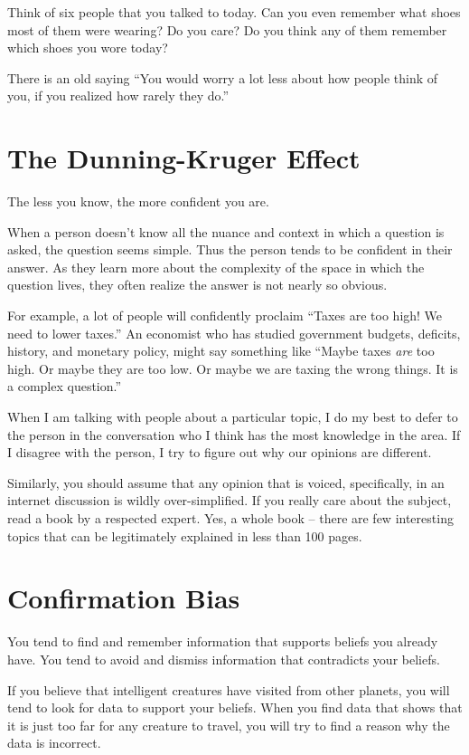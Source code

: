 Think of six people that you talked to today. Can you even remember what
shoes most of them were wearing? Do you care? Do you think any of them
remember which shoes you wore today?

There is an old saying ``You would worry a lot less about how people
think of you, if you realized how rarely they do.''

\section{The Dunning-Kruger Effect}

The less you know, the more confident you are.

When a person doesn't know all the nuance and context in which a question is
asked, the question seems simple. Thus the person tends to be confident in
their answer. As they learn more about the complexity of the space in
which the question lives, they often realize the answer is not nearly so
obvious.

For example, a lot of people will confidently proclaim ``Taxes are too
high! We need to lower taxes.''  An economist who has studied
government budgets, deficits, history, and monetary policy, might say
something like ``Maybe taxes \emph{are} too high. Or maybe they are
too low. Or maybe we are taxing the wrong things. It is a 
complex question.''

When I am talking with people about a particular topic, I do my best
to defer to the person in the conversation who I think has the most
knowledge in the area. If I disagree with the person, I try to figure
out why our opinions are different.

Similarly, you should assume that any opinion that is voiced, specifically, in an
internet discussion is wildly over-simplified. If you really care
about the subject, read a book by a respected expert. Yes, a whole
book -- there are few interesting topics that can be legitimately
explained in less than 100 pages.

\section{Confirmation Bias}

You tend to find and remember information that supports
beliefs you already have. You tend to avoid and dismiss information
that contradicts your beliefs.

If you believe that intelligent creatures have visited from other
planets, you will tend to look for data to support your beliefs. When
you find data that shows that it is just too far for any creature to
travel, you will try to find a reason why the data is incorrect.

